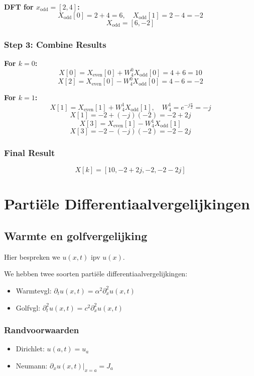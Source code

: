 \documentclass[a4paper]{report}
\begin{document}
\textbf{DFT for \( x_{\text{odd}} = [2, 4] \):}
\[
	X_{\text{odd}}[0] = 2 + 4 = 6, \quad X_{\text{odd}}[1] = 2 - 4 = -2
\]
\[
	X_{\text{odd}} = [6, -2]
\]

\subsection*{Step 3: Combine Results}
\textbf{For \( k = 0 \):}
\[
	X[0] = X_{\text{even}}[0] + W_4^0 X_{\text{odd}}[0] = 4 + 6 = 10
\]
\[
	X[2] = X_{\text{even}}[0] - W_4^0 X_{\text{odd}}[0] = 4 - 6 = -2
\]

\textbf{For \( k = 1 \):}
\[
	X[1] = X_{\text{even}}[1] + W_4^1 X_{\text{odd}}[1], \quad W_4^1 = e^{-j\frac{\pi}{2}} = -j
\]
\[
	X[1] = -2 + (-j)(-2) = -2 + 2j
\]
\[
	X[3] = X_{\text{even}}[1] - W_4^1 X_{\text{odd}}[1]
\]
\[
	X[3] = -2 - (-j)(-2) = -2 - 2j
\]

\subsection*{Final Result}
\[
	X[k] = [10, -2 + 2j, -2, -2 - 2j]
\]

\chapter{Partiële Differentiaalvergelijkingen}

\section{Warmte en golfvergelijking}

Hier bespreken we $u(x, t)$ ipv $u(x)$.

We hebben twee soorten partiële differentiaalvergelijkingen:

\begin{itemize}
	\item Warmtevgl: $\partial_t u(x, t) = \alpha^2 \partial_{x}^2 u(x, t)$
	\item Golfvgl: $\partial_{t}^2 u(x, t) = c^2 \partial_{x}^2 u(x, t)$
\end{itemize}

\subsection{Randvoorwaarden}

\begin{itemize}
	\item Dirichlet: $u(a, t) = u_a$
	\item Neumann: $\partial_x u(x, t) |_{x=a} = J_a$
\end{itemize}
\end{document}
